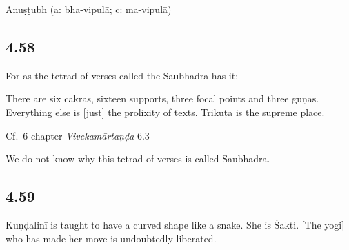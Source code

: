 \begin{ekdosis}
\begin{philcomm}[hp04_057]
\end{philcomm}

\begin{metre}[hp04_057]
Anuṣṭubh (a: bha-vipulā; c: ma-vipulā)
\end{metre}

\subsection*{4.58}
\begin{translation}[hp04_058]
For as the tetrad of verses called the Saubhadra has it:

There are six cakras, sixteen supports, three focal points and three guṇas. Everything else is [just] the prolixity of texts. Trikūṭa is the supreme place.
\end{translation}


\begin{testimonia}[hp04_058]
Cf.~6-chapter \emph{Vivekamārtaṇḍa} 6.3
\begin{versinnote}
\end{versinnote}
\end{testimonia}

\begin{philcomm}[hp04_058]
We do not know why this tetrad of verses is called Saubhadra.
\end{philcomm}

\subsection*{4.59}
\begin{translation}[hp04_059]
Kuṇḍalinī is taught to have a curved shape like a snake. She is Śakti. [The yogi] who has made her move is undoubtedly liberated.
\end{translation}




\end{ekdosis}
